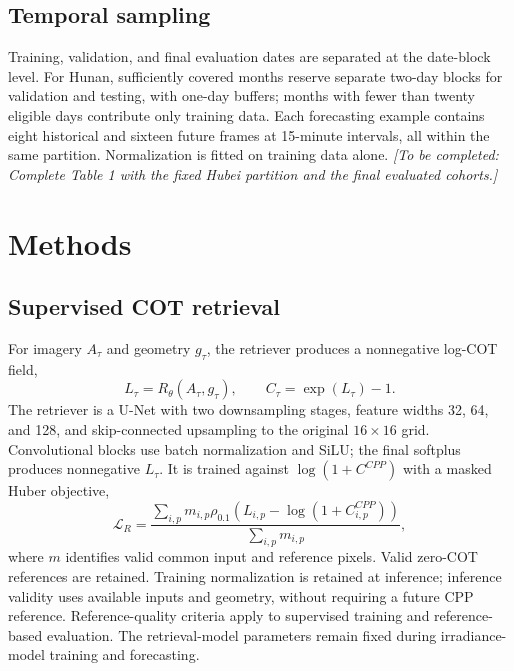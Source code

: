 \documentclass[11pt]{article}
\newcommand{\pending}[1]{\textit{[To be completed: #1]}}
\begin{document}
\subsection{Temporal sampling}
Training, validation, and final evaluation dates are separated at the date-block level. For Hunan, sufficiently covered months reserve separate two-day blocks for validation and testing, with one-day buffers; months with fewer than twenty eligible days contribute only training data. Each forecasting example contains eight historical and sixteen future frames at 15-minute intervals, all within the same partition. Normalization is fitted on training data alone. \pending{Complete Table 1 with the fixed Hubei partition and the final evaluated cohorts.}

\section{Methods}
\subsection{Supervised COT retrieval}
For imagery $A_\tau$ and geometry $g_\tau$, the retriever produces a nonnegative log-COT field,
\begin{equation}
L_\tau=R_\theta(A_\tau,g_\tau),\qquad C_\tau=\exp(L_\tau)-1.
\label{eq:retrieval}
\end{equation}
The retriever is a U-Net with two downsampling stages, feature widths 32, 64, and 128, and skip-connected upsampling to the original $16\times16$ grid. Convolutional blocks use batch normalization and SiLU; the final softplus produces nonnegative $L_\tau$. It is trained against $\log(1+C^{CPP})$ with a masked Huber objective,
\begin{equation}
\mathcal L_R=\frac{\sum_{i,p}m_{i,p}\rho_{0.1}\!\left(L_{i,p}-\log(1+C^{CPP}_{i,p})\right)}{\sum_{i,p}m_{i,p}},
\label{eq:retrieval-loss}
\end{equation}
where $m$ identifies valid common input and reference pixels. Valid zero-COT references are retained. Training normalization is retained at inference; inference validity uses available inputs and geometry, without requiring a future CPP reference. Reference-quality criteria apply to supervised training and reference-based evaluation. The retrieval-model parameters remain fixed during irradiance-model training and forecasting.
\end{document}
